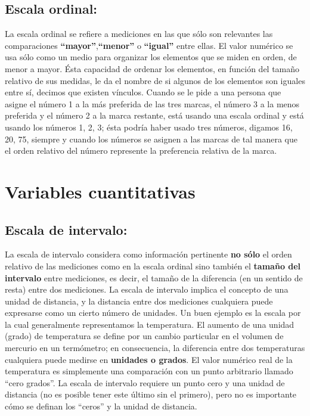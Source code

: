 \documentclass[
  a4paper,
  oneside,
  openany]{book}
\begin{document}
\hypertarget{escala-ordinal}{%
\subsection{Escala ordinal:}\label{escala-ordinal}}

La escala ordinal se refiere a mediciones en las que sólo son relevantes las comparaciones \textbf{``mayor''},\textbf{``menor''} o \textbf{``igual''} entre ellas. El valor numérico se usa sólo como un medio para organizar los elementos que se miden en orden, de menor a mayor.
Ésta capacidad de ordenar los elementos, en función del tamaño relativo de sus medidas, le da el nombre de si algunos de los elementos son iguales entre sí, decimos que existen vínculos. Cuando se le pide a una persona que asigne el número 1 a la más preferida de las tres marcas, el número 3 a la menos preferida y el número 2 a la marca restante, está usando una escala ordinal y está usando los números 1, 2, 3; ésta podría haber usado tres números, digamos 16, 20, 75, siempre y cuando los números se asignen a las marcas de tal manera que el orden relativo del número represente la preferencia relativa de la marca.

\hypertarget{variables-cuantitativas}{%
\section{Variables cuantitativas}\label{variables-cuantitativas}}

\hypertarget{escala-de-intervalo}{%
\subsection{Escala de intervalo:}\label{escala-de-intervalo}}

La escala de intervalo considera como información pertinente \textbf{no sólo} el orden relativo de las mediciones como en la escala ordinal sino también el \textbf{tamaño del intervalo} entre mediciones, es decir, el tamaño de la diferencia (en un sentido de resta) entre dos mediciones. La escala de intervalo implica el concepto de una unidad de distancia, y la distancia entre dos mediciones cualquiera puede expresarse como un cierto número de unidades. Un buen ejemplo es la escala por la cual generalmente representamos la temperatura. El aumento de una unidad (grado) de temperatura se define por un cambio particular en el volumen de mercurio en un termómetro; en consecuencia, la diferencia entre dos temperaturas cualquiera puede medirse en \textbf{unidades o grados}. El valor numérico real de la temperatura es simplemente una comparación con un punto arbitrario llamado ``cero grados''. La escala de intervalo requiere un punto cero y una unidad de distancia (no es posible tener este último sin el primero), pero no es importante cómo se definan los ``ceros'' y la unidad de distancia.
\end{document}
